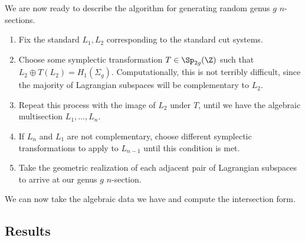 We are now ready to describe the algorithm for generating random genus $g$ $n$-sections.
\begin{enumerate}
	\item Fix the standard $L_1,L_2$ corresponding to the standard cut systems.
	\item Choose some symplectic transformation $T \in \Sp_{2g}(\Z)$ such that $L_2 \oplus T(L_2) = H_1(\Sigma_g)$. Computationally, this is not terribly difficult, since the majority of Lagrangian subspaces will be complementary to $L_2$.
	\item Repeat this process with the image of $L_2$ under $T$, until we have the algebraic multisection $L_1, \dots, L_n$.
	\item If $L_n$ and $L_1$ are not complementary, choose different symplectic transformations to apply to $L_{n - 1}$ until this condition is met.
	\item Take the geometric realization of each adjacent pair of Lagrangian subspaces to arrive at our genus $g$ $n$-section.
\end{enumerate}

We can now take the algebraic data we have and compute the intersection form.

\subsection{Results}

